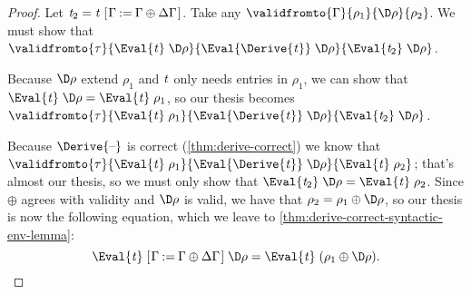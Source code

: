 \begin{proof}
  Let \ensuremath{\Varid{t}_{2}\mathrel{=}\Varid{t}\;[\mskip1.5mu \Gamma\mathbin{:=}\Gamma\oplus \Delta \Gamma\mskip1.5mu]}.
  Take any \ensuremath{\validfromto{\Gamma}{\rho_{1}}{\D\rho}{\rho_{2}}}. We must show that
  \ensuremath{\validfromto{\tau}{\Eval{\Varid{t}}\;\D\rho}{\Eval{\Derive{\Varid{t}}}\;\D\rho}{\Eval{\Varid{t}_{2}}\;\D\rho}}.

  Because \ensuremath{\D\rho} extend \ensuremath{\rho_{1}} and \ensuremath{\Varid{t}} only needs entries
  in \ensuremath{\rho_{1}}, we can show that \ensuremath{\Eval{\Varid{t}}\;\D\rho\mathrel{=}\Eval{\Varid{t}}\;\rho_{1}}, so
  our thesis becomes \ensuremath{\validfromto{\tau}{\Eval{\Varid{t}}\;\rho_{1}}{\Eval{\Derive{\Varid{t}}}\;\D\rho}{\Eval{\Varid{t}_{2}}\;\D\rho}}.

  Because \ensuremath{\Derive{\text{\textendash}}} is correct (\cref{thm:derive-correct}) we know
  that \ensuremath{\validfromto{\tau}{\Eval{\Varid{t}}\;\rho_{1}}{\Eval{\Derive{\Varid{t}}}\;\D\rho}{\Eval{\Varid{t}}\;\rho_{2}}}; that's almost our thesis, so we must only show that
  \ensuremath{\Eval{\Varid{t}_{2}}\;\D\rho\mathrel{=}\Eval{\Varid{t}}\;\rho_{2}}.
  Since \ensuremath{\oplus } agrees with
  validity and \ensuremath{\D\rho} is valid, we have that \ensuremath{\rho_{2}\mathrel{=}\rho_{1}\oplus \D\rho}, so our thesis is now the following equation, which we
  leave to \cref{thm:derive-correct-syntactic-env-lemma}:
  \[\ensuremath{\Eval{\Varid{t}}\;[\mskip1.5mu \Gamma\mathbin{:=}\Gamma\oplus \Delta \Gamma\mskip1.5mu]\;\D\rho\mathrel{=}\Eval{\Varid{t}}\;(\rho_{1}\oplus \D\rho)}.\]
\end{proof}

